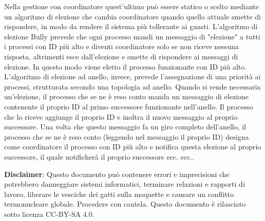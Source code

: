 \documentclass[answers, a4paper, 11pt]{exam}
\begin{document}
\begin{questions}
\begin{parts}
\begin{solution}
			Nella gestione con coordinatore quest'ultimo può essere statico o scelto mediante un algoritmo di elezione che cambia coordinatore quando quello attuale smette di rispondere, in modo da rendere il sistema più tollerante ai guasti.
			L'algoritmo di elezione Bully prevede che ogni processo mandi un messaggio di "elezione" a tutti i processi con ID più alto e diventi coordinatore solo se non riceve nessuna risposta, altrimenti esce dall'elezione e smette di rispondere ai messaggi di elezione.
			In questo modo viene eletto il processo funzionante con ID più alto.
			L'algoritmo di elezione ad anello, invece, prevede l'assegnazione di una priorità ai processi, strutturata secondo una topologia ad anello.
			Quando si rende necessaria un'elezione, il processo che se ne è reso conto manda un messaggio di elezione contenente il proprio ID al primo successore funzionante nell'anello.
			Il processo che lo riceve aggiunge il proprio ID e inoltra il nuovo messaggio al proprio successore.
			Una volta che questo messaggio fa un giro completo dell'anello, il processo che se ne è reso conto (leggendo nel messaggio il proprio ID) designa come coordinatore il processo con ID più alto e notifica questa elezione al proprio successore, il quale notificherà il proprio successore ecc. ecc..
		\end{solution}
	\end{parts}
\end{questions}
\textbf{Disclaimer}: Questo documento può contenere errori e imprecisioni che potrebbero danneggiare sistemi informatici, terminare relazioni e rapporti di lavoro, liberare le vesciche dei gatti sulla moquette e causare un conflitto termonucleare globale. Procedere con cautela.
Questo documento è rilasciato sotto licenza CC-BY-SA 4.0. \ccbysa
\end{document}
